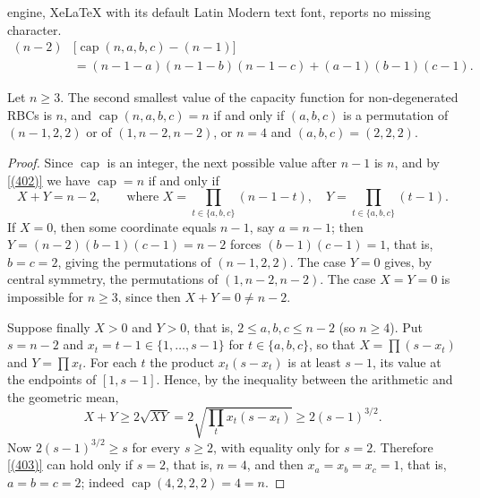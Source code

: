 \documentclass[10pt,a4paper]{amsart}
\newcommand{\capa}{\operatorname{cap}}    %
\begin{document}
engine, XeLaTeX with its default Latin Modern text font, reports no missing character.
\begin{equation}\label{(402)}
\begin{split}
(n-2)&\bigl[\capa(n,a,b,c)-(n-1)\bigr]\\
&=(n-1-a)(n-1-b)(n-1-c)+(a-1)(b-1)(c-1).
\end{split}
\end{equation}

\begin{statm}\label{statm:secondcap}
Let $n\geq 3$. The second smallest value of the capacity function for
non-degenerated RBCs is $n$, and $\capa(n,a,b,c)=n$ if and only if $(a,b,c)$ is a
permutation of $(n-1,2,2)$ or of $(1,n-2,n-2)$, or $n=4$ and $(a,b,c)=(2,2,2)$.
\end{statm}

\begin{proof}
Since $\capa$ is an integer, the next possible value after $n-1$ is $n$, and by
\eqref{(402)} we have $\capa=n$ if and only if
\begin{equation}\label{(403)}
X+Y=n-2,\qquad\text{where }X=\!\!\prod_{t\in\{a,b,c\}}\!\!(n-1-t),\quad
Y=\!\!\prod_{t\in\{a,b,c\}}\!\!(t-1).
\end{equation}
If $X=0$, then some coordinate equals $n-1$, say $a=n-1$; then
$Y=(n-2)(b-1)(c-1)=n-2$ forces $(b-1)(c-1)=1$, that is, $b=c=2$, giving the
permutations of $(n-1,2,2)$. The case $Y=0$ gives, by central symmetry, the
permutations of $(1,n-2,n-2)$. The case $X=Y=0$ is impossible for $n\geq 3$, since
then $X+Y=0\neq n-2$.

Suppose finally $X>0$ and $Y>0$, that is, $2\leq a,b,c\leq n-2$ (so $n\geq 4$). Put
$s=n-2$ and $x_t=t-1\in\{1,\ldots ,s-1\}$ for $t\in\{a,b,c\}$, so that
$X=\prod(s-x_t)$ and $Y=\prod x_t$. For each $t$ the product $x_t(s-x_t)$ is at
least $s-1$, its value at the endpoints of $[1,s-1]$. Hence, by the inequality
between the arithmetic and the geometric mean,
\[
X+Y\geq 2\sqrt{XY}=2\sqrt{\textstyle\prod_t x_t(s-x_t)}\geq 2(s-1)^{3/2}.
\]
Now $2(s-1)^{3/2}\geq s$ for every $s\geq 2$, with equality only for $s=2$.
Therefore \eqref{(403)} can hold only if $s=2$, that is, $n=4$, and then
$x_a=x_b=x_c=1$, that is, $a=b=c=2$; indeed $\capa(4,2,2,2)=4=n$.%
\end{proof}
\end{document}

